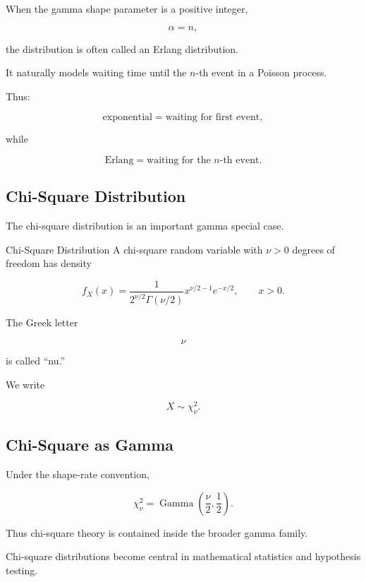 When the gamma shape parameter is a positive integer,

\[
\alpha=n,
\]

the distribution is often called an Erlang distribution.

It naturally models waiting time until the \(n\)-th event in a Poisson
process.

Thus:

\[
\boxed{
\text{exponential}
=
\text{waiting for first event},
}
\]

while

\[
\boxed{
\text{Erlang}
=
\text{waiting for the \(n\)-th event}.
}
\]

\subsection{Chi-Square Distribution}
\label{subsec:chi-square-distribution}

The chi-square distribution is an important gamma special case.

\begin{definitionbox}{Chi-Square Distribution}
A chi-square random variable with \(\nu>0\) degrees of freedom has
density

\[
\boxed{
f_X(x)
=
\frac{
1
}{
2^{\nu/2}
\Gamma(\nu/2)
}
x^{\nu/2-1}
e^{-x/2},
\qquad
x>0.
}
\]
\end{definitionbox}

The Greek letter

\[
\nu
\]

is called ``nu.''

We write

\[
\boxed{
X\sim\chi^2_\nu.
}
\]

\subsection{Chi-Square as Gamma}
\label{subsec:chi-square-gamma}

Under the shape-rate convention,

\[
\boxed{
\chi^2_\nu
=
\operatorname{Gamma}
\left(
\frac{\nu}{2},
\frac12
\right).
}
\]

Thus chi-square theory is contained inside the broader gamma family.

Chi-square distributions become central in mathematical statistics and
hypothesis testing.

